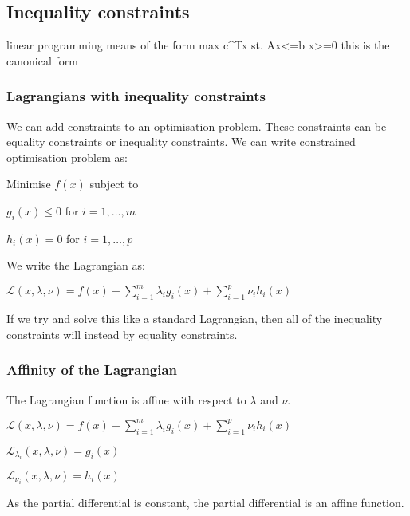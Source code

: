 
\subsection{Inequality constraints}

linear programming means of the form
max c^Tx
st. Ax<=b
x>=0
this is the canonical form

\subsubsection{Lagrangians with inequality constraints}

We can add constraints to an optimisation problem. These constraints can be equality constraints or inequality constraints. We can write constrained optimisation problem as:

Minimise \(f(x)\) subject to 

\(g_i(x)\le 0\) for \(i=1,…,m\)

\(h_i(x)=0\) for \(i=1,…,p\)

We write the Lagrangian as:

\(\mathcal{L}(x, \lambda, \nu )=f(x)+\sum_{i=1}^m\lambda_i g_i(x)+\sum_{i=1}^p\nu_ih_i(x)\)

If we try and solve this like a standard Lagrangian, then all of the inequality constraints will instead by equality constraints.

\subsubsection{Affinity of the Lagrangian}

The Lagrangian function is affine with respect to \(\lambda \) and \(\nu \).

\(\mathcal{L}(x, \lambda, \nu )=f(x)+\sum_{i=1}^m\lambda_i g_i(x)+\sum_{i=1}^p\nu_ih_i(x)\)

\(\mathcal{L}_{\lambda_i}(x, \lambda, \nu )=g_i(x)\)

\(\mathcal{L}_{\nu_i}(x, \lambda, \nu )=h_i(x)\)

As the partial differential is constant, the partial differential is an affine function.

